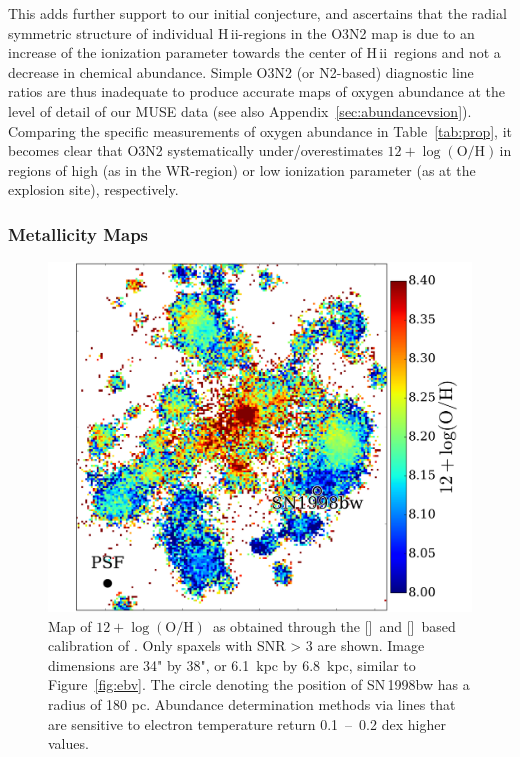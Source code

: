 \documentclass[traditabstract]{aa}
\newcommand{\hii}{\mbox{H\,{\sc ii}}}
\newcommand{\oh}{12+\log(\mathrm{O/H})}
\newcommand{\sii}{[\ion{S}{ii}]}
\newcommand{\nii}{[\ion{N}{ii}]}
\begin{document}
This adds further support to our initial conjecture, and ascertains that the radial symmetric structure of individual \hii-regions in the O3N2 map is due to an increase of the ionization parameter towards the center of \hii~regions and not a decrease in chemical abundance. Simple O3N2 (or N2-based) diagnostic line ratios are thus inadequate to produce accurate maps of oxygen abundance at the level of detail of our MUSE data (see also Appendix~\ref{sec:abundancevsion}). Comparing the specific measurements of oxygen abundance in Table~\ref{tab:prop}, it becomes clear that O3N2 systematically under/overestimates $\oh$\,in regions of high (as in the WR-region) or low ionization parameter (as at the explosion site), respectively.

\subsubsection{Metallicity Maps}
\label{sec:mapoh}

\begin{figure}
\includegraphics[angle=0, width=0.99\columnwidth]{Figs/MUSE_SN1998bw_OH.pdf}
\caption{Map of $\oh$\, as obtained through the \sii\, and \nii\, based calibration of \citet{2016Ap&SS.361...61D}. Only spaxels with SNR > 3 are shown. Image dimensions are 34" by 38", or 6.1~kpc by 6.8~kpc, similar to Figure~\ref{fig:ebv}. The circle denoting the position of SN\,1998bw has a radius of 180 pc. Abundance determination methods via lines that are sensitive to electron temperature return 0.1~--~0.2 dex higher values.}
\label{fig:s2}
\end{figure}
\end{document}
